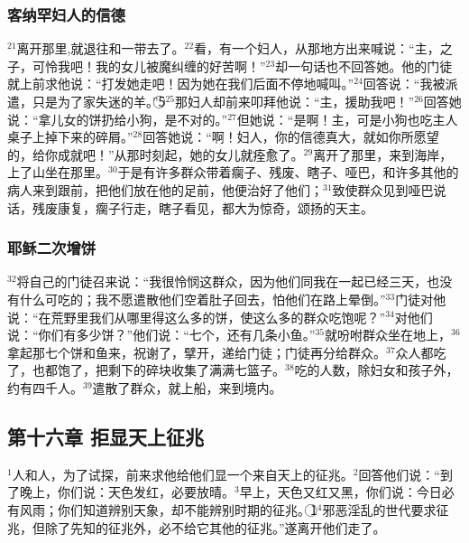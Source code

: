 \subsubsection{客纳罕妇人的信德}
$^{21}$\UL[耶稣]离开那里,就退往\UL[提洛]和\UL[漆冬]一带去了。$^{22}$看，有一个\UL[客纳罕]妇人，从那地方出来喊说：“主，\UL[达味]之子，可怜我吧！我的女儿被魔纠缠的好苦啊！”$^{23}$\UL[耶稣]却一句话也不回答她。他的门徒就上前求他说：“打发她走吧！因为她在我们后面不停地喊叫。”$^{24}$\UL[耶稣]回答说：“我被派遣，只是为了\UL[以色列]家失迷的羊。”\textcircled{5}$^{25}$那妇人却前来叩拜他说：“主，援助我吧！”$^{26}$\UL[耶稣]回答她说：“拿儿女的饼扔给小狗，是不对的。”$^{27}$但她说：“是啊！主，可是小狗也吃主人桌子上掉下来的碎屑。”$^{28}$\UL[耶稣]回答她说：“啊！妇人，你的信德真大，就如你所愿望的，给你成就吧！”从那时刻起，她的女儿就痊愈了。$^{29}$\UL[耶稣]离开了那里，来到\UL[加里]\UL[肋亚]海岸，上了山坐在那里。$^{30}$于是有许多群众带着瘸子、残废、瞎子、哑巴，和许多其他的病人来到\UL[耶稣]跟前，把他们放在他的足前，他便治好了他们；$^{31}$致使群众见到哑巴说话，残废康复，瘸子行走，瞎子看见，都大为惊奇，颂扬\UL[以色列]的天主。


\subsubsection{耶稣二次增饼}
$^{32}$\UL[耶稣]将自己的门徒召来说：“我很怜悯这群众，因为他们同我在一起已经三天，也没有什么可吃的；我不愿遣散他们空着肚子回去，怕他们在路上晕倒。”$^{33}$门徒对他说：“在荒野里我们从哪里得这么多的饼，使这么多的群众吃饱呢？”$^{34}$\UL[耶稣]对他们说：“你们有多少饼？”他们说：“七个，还有几条小鱼。”$^{35}$\UL[耶稣]就吩咐群众坐在地上，$^{36}$拿起那七个饼和鱼来，祝谢了，擘开，递给门徒；门徒再分给群众。$^{37}$众人都吃了，也都饱了，把剩下的碎块收集了满满七篮子。$^{38}$吃的人数，除妇女和孩子外，约有四千人。$^{39}$\UL[耶稣]遣散了群众，就上船，来到\UL[玛加丹]境内。


\subsection{第十六章 拒显天上征兆}
$^{1}$\UL[法利塞]人和\UL[撒杜塞]人，为了试探\UL[耶稣]，前来求他给他们显一个来自天上的征兆。$^{2}$\UL[耶稣]回答他们说：“到了晚上，你们说：天色发红，必要放晴。$^{3}$早上，天色又红又黑，你们说：今日必有风雨；你们知道辨别天象，却不能辨别时期的征兆。\textcircled{1}$^{4}$邪恶淫乱的世代要求征兆，但除了\UL[约纳]先知的征兆外，必不给它其他的征兆。”\UL[耶稣]遂离开他们走了。


